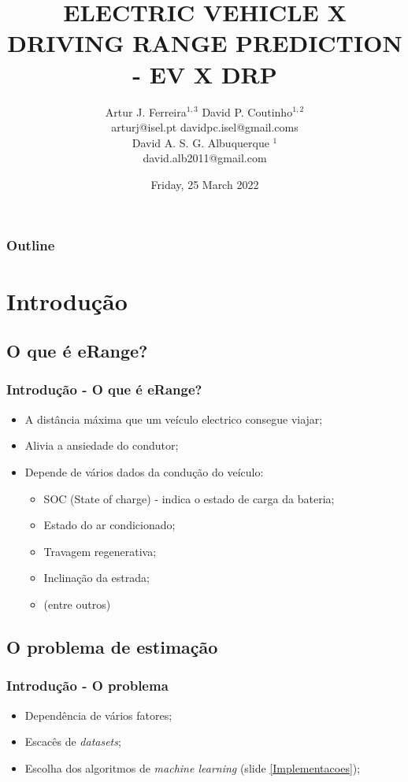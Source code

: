 \documentclass{beamer}
\title{\uppercase{Electric Vehicle X Driving Range Prediction - EV X DRP}}
\author{
	{\large Artur J. Ferreira$^{1,3}$ \qquad David P. Coutinho$^{1,2}$} \\
	{\qquad \qquad \hspace{-1cm} arturj@isel.pt \qquad \qquad davidpc.isel@gmail.coms} \\
    {\vspace{1cm}}
    {\large David A. S. G. Albuquerque $^{1}$} \\
    {david.alb2011@gmail.com}
}
\institute
{
	\vspace{0.5cm} \\
	{\normalsize $^1$Instituto Superior de Engenharia de Lisboa } \\
	{\normalsize $^2$Instituto Superior T\'{e}cnico} \\
	{\normalsize $^3$Instituto de Telecomunica\c{c}\~{o}es,  Lisboa, PORTUGAL} \\	
}
\date{
	\vspace{-0.75cm}
	Friday, 25 March 2022
}
\begin{document}
\begin{frame}[t,plain]
    \titlepage
\end{frame}

\begin{frame}
    \frametitle{Outline}
    \tableofcontents
\end{frame}

\section[Introducao]{Introdução}
\subsection[eRange]{O que é eRange?}
\begin{frame}
\frametitle{Introdução - O que é eRange?}

\begin{itemize}
	\item A distância máxima que um veículo electrico consegue viajar;
	\item Alivia a ansiedade do condutor; 
	\item Depende de vários dados da condução do veículo:
		  \begin{itemize}
			  \item SOC (State of charge) - indica o estado de carga da bateria;
			  \item Estado do ar condicionado;
			  \item Travagem regenerativa;
			  \item Inclinação da estrada;
			  \item (entre outros)
		  \end{itemize}
\end{itemize}


\end{frame}

\subsection[Problema]{O problema de estimação}
\begin{frame}
\frametitle{Introdução - O problema}

\begin{itemize}
	\item Dependência de vários fatores;
	\item Escacês de \textit{datasets};
	\item Escolha dos algoritmos de \textit{machine learning} (slide \ref{Implementacoes});
\end{itemize}

\end{frame}
\end{document}
